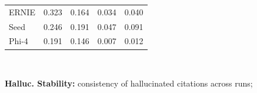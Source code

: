 \begin{table}[t]
\begin{tabular}{lcccc}
\cellcolor{tableRowLight}ERNIE & \cellcolor{green!12}0.323 & \cellcolor{green!12}0.164 & \cellcolor{red!10}0.034 & \cellcolor{red!10}0.040 \\
\cellcolor{tableRowWhite}Seed & \cellcolor{green!10}0.246 & \cellcolor{green!10}0.191 & \cellcolor{red!10}0.047 & \cellcolor{red!10}0.091 \\
\cellcolor{tableRowLight}Phi-4 & \cellcolor{green!8}0.191 & \cellcolor{green!8}0.146 & \cellcolor{red!6}0.007 & \cellcolor{red!6}0.012 \\
\bottomrule
\end{tabular}\\[0.5em]
\raggedright
\footnotesize
\colorbox{red!28}{\textbf{Halluc. Stability:}} consistency of hallucinated citations across runs;
\end{table}

